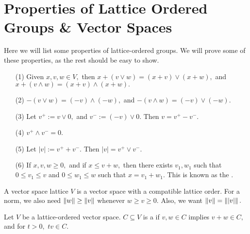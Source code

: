 \section{Properties of Lattice Ordered Groups \& Vector Spaces}
Here we will list some properties of lattice-ordered groups. We will prove some of these properties, as the rest should be easy to show.
\begin{frame*}
\begin{enumerate}

\item[(1)] Given $x,v,w\in V,$ then $x+(v\lor w)=(x+v)\lor(x+w),$ and $x+(v\land w)=(x+v)\land(x+w).$
\item[(2)] $-(v\lor w)=(-v)\land(-w),$ and $-(v\land w)=(-v)\lor(-w).$ \\
\item[(3)] Let $v^+:=v\lor 0,$ and $v^-:=(-v)\lor 0.$ Then $v=v^+-v^-.$ \\
\item[(4)] $v^+\land v^-=0.$ \\
\item[(5)] Let $|v|:=v^++v^-.$ Then $|v|=v^+\lor v^-.$ \\
\item[(6)] If $x,v,w\geq 0,$ and if $x\leq v+w,$ then there exists $v_1,w_1$ such that $0\leq v_1\leq v$ and $0\leq w_1\leq w$ such that $x=v_1+w_1.$ This is known as the .

\end{enumerate}
\end{frame*}

\noindent *A vector space lattice $V$ is a vector space with a compatible lattice order. For a norm, we also need $\left\lVert w\right\rVert\geq\left\lVert v\right\rVert$ whenever $w\geq v\geq 0.$ Also, we want $\left\lVert v\right\rVert=\left\lVert|v|\right\rVert.$


\begin{defn}
Let $V$ be a lattice-ordered vector space. $C\subseteq V$ is a  if $v,w\in C$ implies $v+w\in C,$ and for $t>0,$ $tv\in C.$
\end{defn}

